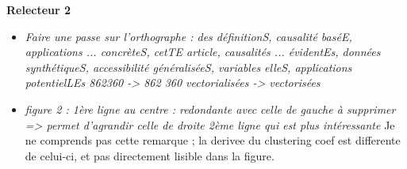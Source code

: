 \documentclass[11pt,a4paper,sans]{moderncv}        %
\begin{document}
\textbf{Relecteur 2}

\begin{itemize}
	\item \textit{Faire une passe sur l'orthographe : des définitionS, causalité baséE, applications ... concrèteS, cetTE article, causalités ... évidentEs, données synthétiqueS, accessibilité généraliséeS, variables elleS, applications potentielLEs 862360 -> 862 360 vectorialisées -> vectorisées}
	\item \textit{ figure 2 : 1ère ligne au centre : redondante avec celle de gauche à supprimer => permet d'agrandir celle de droite 2ème ligne qui est plus intéressante} Je ne comprends pas cette remarque ; la derivee du clustering coef est differente de celui-ci, et pas directement lisible dans la figure.
\end{itemize}











\makeletterclosing
\end{document}
